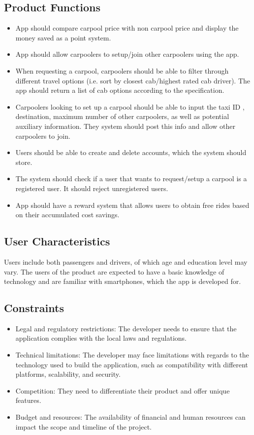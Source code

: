 \documentclass[]{article}
\begin{document}
\subsection{Product Functions}
\label{sub:product_functions}
\begin{itemize}
	\item App should compare carpool price with non carpool price and display the money saved as a point system.
	\item App should allow carpoolers to setup/join other carpoolers using the app.
	\item When requesting a carpool, carpoolers should be able to filter through different travel options (i.e. sort by closest cab/highest rated cab driver). The app should return a list of cab options according to the specification.
	\item Carpoolers looking to set up a carpool should be able to input the taxi ID , destination, maximum number of other carpoolers, as well as potential auxiliary information. They system should post this info and allow other carpoolers to join.
	\item Users should be able to create and delete accounts, which the system should store.
	\item The system should check if a user that wants to request/setup a carpool is a registered user. It should reject unregistered users.
	\item App should have a reward system that allows users to obtain free rides based on their accumulated cost savings.
\end{itemize}

\subsection{User Characteristics}
\label{sub:user_characteristics}
Users include both passengers and drivers, of which age and education level may vary. The users of the product are expected to have a basic knowledge of technology and are familiar with smartphones, which the app is developed for.	 

\subsection{Constraints}
\label{sub:constraints}
\begin{itemize}
	\item Legal and regulatory restrictions: The developer needs to ensure that the application complies with the local laws and regulations.
	\item Technical limitations: The developer may face limitations with regards to the technology used to build the application, such as compatibility with different platforms, scalability, and security.
	\item Competition: They need to differentiate their product and offer unique features.
	\item Budget and resources: The availability of financial and human resources can impact the scope and timeline of the project.
\end{itemize}
\end{document}
